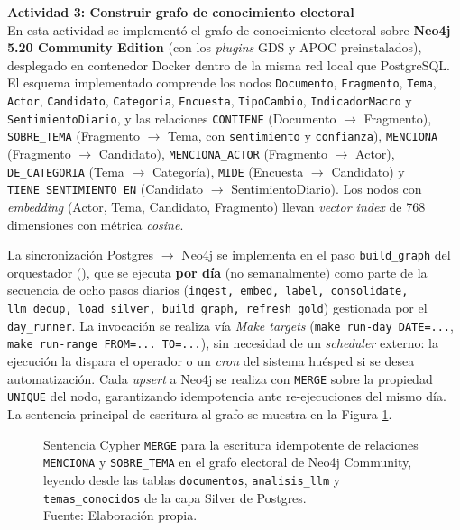 \textbf{Actividad 3: Construir grafo de conocimiento electoral}
\\
En esta actividad se implementó el grafo de conocimiento electoral sobre
\textbf{Neo4j 5.20 Community Edition} (con los \textit{plugins} GDS y APOC
preinstalados), desplegado en contenedor Docker dentro de la misma red local que
PostgreSQL. El esquema implementado comprende los nodos
\texttt{Documento}, \texttt{Fragmento}, \texttt{Tema}, \texttt{Actor},
\texttt{Candidato}, \texttt{Categoria}, \texttt{Encuesta}, \texttt{TipoCambio},
\texttt{IndicadorMacro} y \texttt{SentimientoDiario}, y las relaciones
\texttt{CONTIENE} (Documento $\rightarrow$ Fragmento), \texttt{SOBRE\_TEMA}
(Fragmento $\rightarrow$ Tema, con \texttt{sentimiento} y \texttt{confianza}),
\texttt{MENCIONA} (Fragmento $\rightarrow$ Candidato), \texttt{MENCIONA\_ACTOR}
(Fragmento $\rightarrow$ Actor), \texttt{DE\_CATEGORIA} (Tema $\rightarrow$
Categoría), \texttt{MIDE} (Encuesta $\rightarrow$ Candidato) y
\texttt{TIENE\_SENTIMIENTO\_EN} (Candidato $\rightarrow$ SentimientoDiario). Los
nodos con \textit{embedding} (Actor, Tema, Candidato, Fragmento) llevan
\textit{vector index} de 768 dimensiones con métrica \textit{cosine}.

La sincronización Postgres $\rightarrow$ Neo4j se implementa en el paso
\texttt{build\_graph} del orquestador
(), que se ejecuta
\textbf{por día} (no semanalmente) como parte de la secuencia de ocho pasos
diarios (\texttt{ingest, embed, label, consolidate, llm\_dedup, load\_silver,
build\_graph, refresh\_gold}) gestionada por el \texttt{day\_runner}. La
invocación se realiza vía \textit{Make targets} (\texttt{make run-day DATE=...},
\texttt{make run-range FROM=... TO=...}), sin necesidad de un \textit{scheduler}
externo: la ejecución la dispara el operador o un \textit{cron} del sistema
huésped si se desea automatización. Cada \textit{upsert} a Neo4j se realiza con
\texttt{MERGE} sobre la propiedad \texttt{UNIQUE} del nodo, garantizando
idempotencia ante re-ejecuciones del mismo día. La sentencia principal de
escritura al grafo se muestra en la Figura \ref{5:fig20}.

\begin{figure}[!ht]
    \begin{center}
        
        \caption[Sentencia Cypher MERGE para la escritura idempotente de aristas en el grafo electoral]{Sentencia Cypher \texttt{MERGE} para la escritura idempotente de relaciones \texttt{MENCIONA} y \texttt{SOBRE\_TEMA} en el grafo electoral de Neo4j Community, leyendo desde las tablas \texttt{documentos}, \texttt{analisis\_llm} y \texttt{temas\_conocidos} de la capa Silver de Postgres.\\
            Fuente: Elaboración propia.}
        \label{5:fig20}
    \end{center}
\end{figure}


